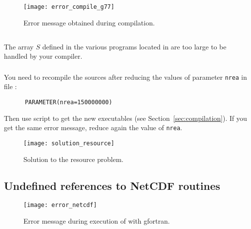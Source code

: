 \begin{figure}[htpb]
\centering
\texttt{[image: error\_compile\_g77]}
\caption{Error message obtained during compilation. \label{fig:error_compile}}
\end{figure}

\subsection{\question}

The array $S$ defined in the various programs located in  are too large to be handled by your compiler. 


\subsubsection{\answer}

You need to recompile the sources after reducing the values of parameter \texttt{nrea} in file :
\begin{verbatim}
      PARAMETER(nrea=150000000)
\end{verbatim}
Then use script  to get the new executables (see Section~\ref{sec:compilation}). If you get the same error message, reduce again the value of \texttt{nrea}.

\begin{figure}[htpb]
\centering
\texttt{[image: solution\_resource]}
\caption{Solution to the resource problem.}
\end{figure}


\subsection{Undefined references to NetCDF routines\label{sec:error_netcdf}}

\begin{figure}[htpb]
\centering
\texttt{[image: error\_netcdf]}
\caption{Error message during execution of  with gfortran\label{fig:error_netcdf}.}
\end{figure}

\subsubsection{\question}

